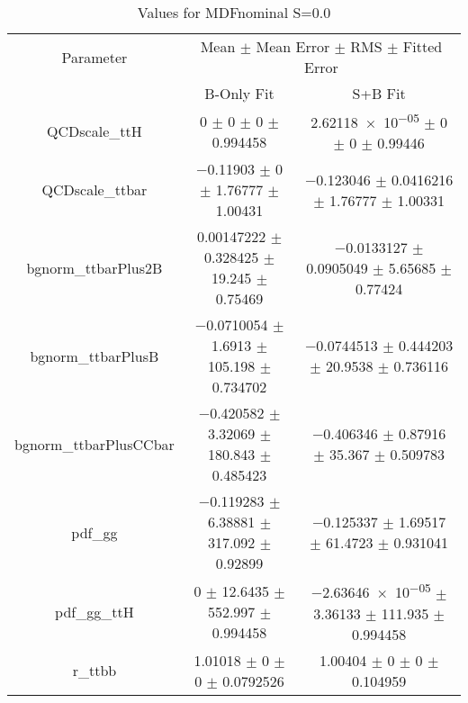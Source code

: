 \begin{table}
\centering
\caption{Values for MDFnominal S=0.0}
\begin{tabular}{ccc}
\toprule
Parameter & \multicolumn{2}{c}{Mean $\pm$ Mean Error $\pm$ RMS $\pm$ Fitted Error}\\
 & B-Only Fit & S+B Fit\\
\midrule
QCDscale\_ttH & \num{0} $\pm$ \num{0} $\pm$ \num{0} $\pm$ \num{0.994458} & \num{2.62118e-05} $\pm$ \num{0} $\pm$ \num{0} $\pm$ \num{0.99446}\\
QCDscale\_ttbar & \num{-0.11903} $\pm$ \num{0} $\pm$ \num{1.76777} $\pm$ \num{1.00431} & \num{-0.123046} $\pm$ \num{0.0416216} $\pm$ \num{1.76777} $\pm$ \num{1.00331}\\
bgnorm\_ttbarPlus2B & \num{0.00147222} $\pm$ \num{0.328425} $\pm$ \num{19.245} $\pm$ \num{0.75469} & \num{-0.0133127} $\pm$ \num{0.0905049} $\pm$ \num{5.65685} $\pm$ \num{0.77424}\\
bgnorm\_ttbarPlusB & \num{-0.0710054} $\pm$ \num{1.6913} $\pm$ \num{105.198} $\pm$ \num{0.734702} & \num{-0.0744513} $\pm$ \num{0.444203} $\pm$ \num{20.9538} $\pm$ \num{0.736116}\\
bgnorm\_ttbarPlusCCbar & \num{-0.420582} $\pm$ \num{3.32069} $\pm$ \num{180.843} $\pm$ \num{0.485423} & \num{-0.406346} $\pm$ \num{0.87916} $\pm$ \num{35.367} $\pm$ \num{0.509783}\\
pdf\_gg & \num{-0.119283} $\pm$ \num{6.38881} $\pm$ \num{317.092} $\pm$ \num{0.92899} & \num{-0.125337} $\pm$ \num{1.69517} $\pm$ \num{61.4723} $\pm$ \num{0.931041}\\
pdf\_gg\_ttH & \num{0} $\pm$ \num{12.6435} $\pm$ \num{552.997} $\pm$ \num{0.994458} & \num{-2.63646e-05} $\pm$ \num{3.36133} $\pm$ \num{111.935} $\pm$ \num{0.994458}\\
r\_ttbb & \num{1.01018} $\pm$ \num{0} $\pm$ \num{0} $\pm$ \num{0.0792526} & \num{1.00404} $\pm$ \num{0} $\pm$ \num{0} $\pm$ \num{0.104959}\\
\bottomrule
\end{tabular}
\end{table}